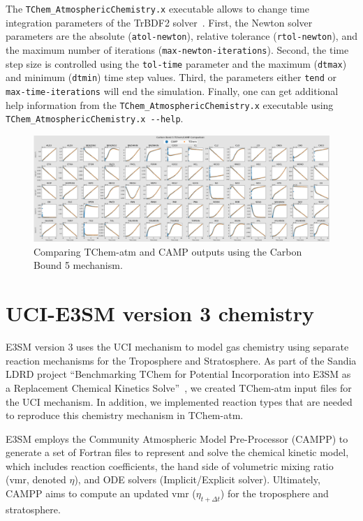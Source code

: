 \documentclass[report, 12pt]{SANDreport}
\begin{document}
The \verb|TChem_AtmosphericChemistry.x| executable allows to change time integration parameters of the TrBDF2 solver~\cite{tinesweb}. First, the Newton solver parameters are the absolute (\verb|atol-newton|), relative tolerance (\verb|rtol-newton|), and the maximum number of iterations (\verb|max-newton-iterations|). Second, the time step size is controlled using the \verb|tol-time| parameter and the maximum (\verb|dtmax|) and minimum (\verb|dtmin|) time step values. Third, the parameters either \verb|tend| or \verb|max-time-iterations| will end the simulation. Finally, one can get additional help information from the \Verb|TChem_AtmosphericChemistry.x| executable using \verb|TChem_AtmosphericChemistry.x --help|.


\begin{figure}[htp]
  \centering
  \includegraphics[width=1\textwidth]{../figures/carbonB5TChemvsCAMP.png}
  \caption{Comparing TChem-atm and CAMP outputs using the Carbon Bound 5 mechanism.}
\label{fig:camp_vs_tchem-atm}
\end{figure}


\section{UCI-E3SM version 3 chemistry}

E3SM version 3 uses the UCI mechanism to model gas chemistry using separate reaction mechanisms for the Troposphere and Stratosphere. As part of the Sandia LDRD project ``Benchmarking TChem for Potential Incorporation into E3SM as a Replacement Chemical Kinetics Solve''~\cite{Diaz-Ibarra:2024:tchem}, we created TChem-atm input files for the UCI mechanism. In addition, we implemented reaction types that are needed to reproduce this chemistry mechanism in TChem-atm.

E3SM employs the Community Atmospheric Model Pre-Processor (CAMPP) to generate a set of Fortran files to represent and solve the chemical kinetic model, which includes reaction coefficients, the hand side of volumetric mixing ratio (vmr, denoted $\eta$), and ODE solvers (Implicit/Explicit solver). Ultimately, CAMPP aims to compute an updated vmr ($\eta_{t+\Delta t}$) for the troposphere and stratosphere.
\end{document}
